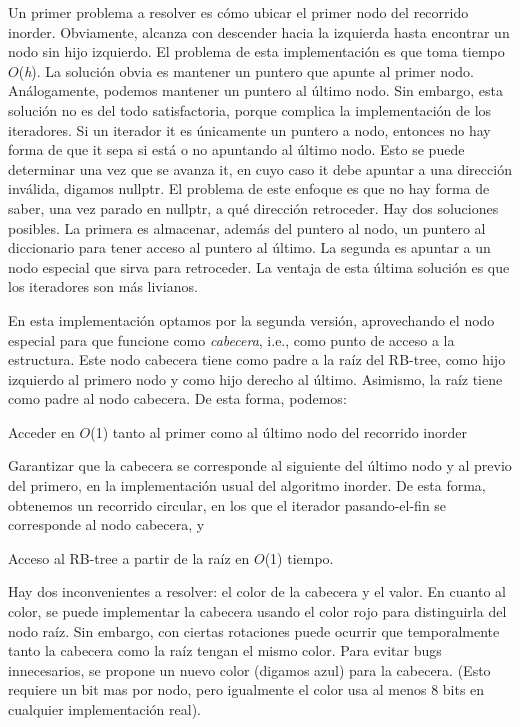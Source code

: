 Un primer problema a resolver es cómo ubicar el primer nodo del recorrido inorder. Obviamente, alcanza con descender hacia la izquierda hasta encontrar un nodo sin hijo izquierdo. El problema de esta implementación es que toma tiempo $O$({\itshape h}). La solución obvia es mantener un puntero que apunte al primer nodo. Análogamente, podemos mantener un puntero al último nodo. Sin embargo, esta solución no es del todo satisfactoria, porque complica la implementación de los iteradores. Si un iterador {\ttfamily it} es únicamente un puntero a nodo, entonces no hay forma de que {\ttfamily it} sepa si está o no apuntando al último nodo. Esto se puede determinar una vez que se avanza {\ttfamily it}, en cuyo caso {\ttfamily it} debe apuntar a una dirección inválida, digamos {\ttfamily nullptr}. El problema de este enfoque es que no hay forma de saber, una vez parado en {\ttfamily nullptr}, a qué dirección retroceder. Hay dos soluciones posibles. La primera es almacenar, además del puntero al nodo, un puntero al diccionario para tener acceso al puntero al último. La segunda es apuntar a un nodo especial que sirva para retroceder. La ventaja de esta última solución es que los iteradores son más livianos.

En esta implementación optamos por la segunda versión, aprovechando el nodo especial para que funcione como {\itshape cabecera}, i.\+e., como punto de acceso a la estructura. Este nodo cabecera tiene como padre a la raíz del R\+B-\/tree, como hijo izquierdo al primero nodo y como hijo derecho al último. Asimismo, la raíz tiene como padre al nodo cabecera. De esta forma, podemos\+:
\begin{DoxyEnumerate}
\item Acceder en $O$(1) tanto al primer como al último nodo del recorrido inorder
\item Garantizar que la cabecera se corresponde al siguiente del último nodo y al previo del primero, en la implementación usual del algoritmo inorder. De esta forma, obtenemos un recorrido circular, en los que el iterador pasando-\/el-\/fin se corresponde al nodo cabecera, y
\item Acceso al R\+B-\/tree a partir de la raíz en $O$(1) tiempo.
\end{DoxyEnumerate}

Hay dos inconvenientes a resolver\+: el color de la cabecera y el valor. En cuanto al color, se puede implementar la cabecera usando el color rojo para distinguirla del nodo raíz. Sin embargo, con ciertas rotaciones puede ocurrir que temporalmente tanto la cabecera como la raíz tengan el mismo color. Para evitar bugs innecesarios, se propone un nuevo color (digamos azul) para la cabecera. (Esto requiere un bit mas por nodo, pero igualmente el color usa al menos 8 bits en cualquier implementación real).

